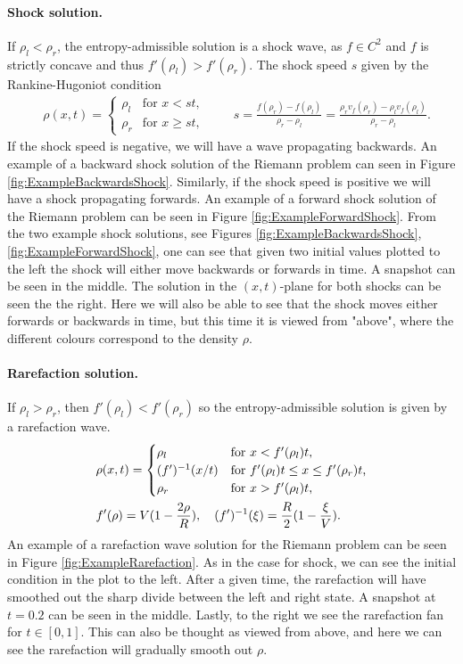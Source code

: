 \documentclass[10pt]{article}
\numberwithin{equation}{section}
\begin{document}
\paragraph{Shock solution.} If $\rho_l < \rho_r$, the entropy-admissible solution is a shock wave, as $f \in C^2$ and $f$ is strictly concave and thus $f'(\rho_l) > f'(\rho_r) $. The shock speed $s$ given by the Rankine-Hugoniot condition
\begin{align*}
    & \rho(x,t) = \begin{cases}
    \rho_l & \text{for $x < st$, } \\
    \rho_r & \text{for $x \geq st$, }
    \end{cases} 
    \quad \quad s = \frac{f(\rho_r) - f(\rho_l)}{\rho_r - \rho_l} = \frac{\rho_r v_f(\rho_r) -\rho_l v_f(\rho_l)}{\rho_r - \rho_l}.
\end{align*}
If the shock speed is negative, we will have a wave propagating backwards. An example of a backward shock solution of the Riemann problem can seen in Figure \ref{fig:ExampleBackwardsShock}. Similarly, if the shock speed is positive we will have a shock propagating forwards. An example of a forward shock solution of the Riemann problem can be seen in Figure \ref{fig:ExampleForwardShock}.
From the two example shock solutions, see Figures \ref{fig:ExampleBackwardsShock}, \ref{fig:ExampleForwardShock}, one can see that given two initial values plotted to the left the shock will either move backwards or forwards in time. A snapshot can be seen in the middle. The solution in the $(x,t)$-plane for both shocks can be seen the the right. Here we will also be able to see that the shock moves either forwards or backwards in time, but this time it is viewed from "above", where the different colours correspond to the density $\rho$. 

\paragraph{Rarefaction solution.} If $\rho_l > \rho_r$, then $f'(\rho_l) < f'(\rho_r) $ so the entropy-admissible solution is given by a rarefaction wave.
\begin{align*}
    & \rho(x,t) = \begin{cases}
    \rho_l & \text{for $x < f'(\rho_l)t$, } \\
    (f')^{-1}(x/t)  &  \text{for $ f'(\rho_l)t \leq x \leq f'(\rho_r)t$,} \\
     \rho_r & \text{for $x > f'(\rho_l)t$, }
    \end{cases} \\
    & f'(\rho) = V(1-\frac{2 \rho}{R}) , \quad  (f')^{-1}(\xi) = \frac{R}{2}(1-\frac{\xi}{V}). 
\end{align*}
An example of a rarefaction wave solution for the Riemann problem can be seen in Figure \ref{fig:ExampleRarefaction}. As in the case for shock, we can see the initial condition in the plot to the left. After a given time, the rarefaction will have smoothed out the sharp divide between the left and right state. A snapshot at $t = 0.2$ can be seen in the middle. Lastly, to the right we see the rarefaction fan for $t \in [0,1]$. This can also be thought as viewed from above, and here we can see the rarefaction will gradually smooth out $\rho$. 
\end{document}
